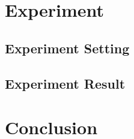 \documentclass[conference]{IEEEtran}
\begin{document}
%




\section{Experiment}
\subsection{Experiment Setting}
\subsection{Experiment Result}
\section{Conclusion}





\end{document}
